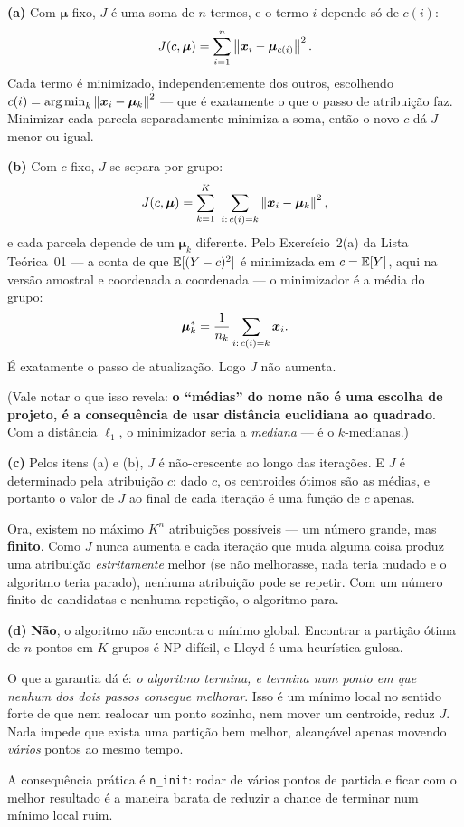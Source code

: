 \documentclass[11pt,a4paper]{article}
\begin{document}
\begin{solucao}
\textbf{(a)} Com $\bm\mu$ fixo, $J$ é uma soma de $n$ termos, e o termo $i$
depende só de $c(i)$:
\[
  J(c,\bm\mu) = \sum_{i=1}^n \left\lVert \bm{x}_i-\bm\mu_{c(i)} \right\rVert^2 .
\]
Cada termo é minimizado, independentemente dos outros, escolhendo
$c(i)=\argmin_k\norm{\x_i-\bm\mu_k}^2$ --- que é exatamente o que o passo de
atribuição faz. Minimizar cada parcela separadamente minimiza a soma, então o
novo $c$ dá $J$ menor ou igual.

\smallskip
\textbf{(b)} Com $c$ fixo, $J$ se separa por grupo:
\[
  J(c,\bm\mu) = \sum_{k=1}^{K}\ \sum_{i:\,c(i)=k}\left\lVert \bm{x}_i-\bm\mu_k \right\rVert^2 ,
\]
e cada parcela depende de um $\bm\mu_k$ diferente. Pelo Exercício~2(a) da Lista
Teórica~01 --- a conta de que $\mathbb{E}[(Y-c)^2]$ é minimizada em $c=\mathbb{E}[Y]$, aqui na
versão amostral e coordenada a coordenada --- o minimizador é a média do grupo:
\[
  \bm\mu_k^\ast = \frac{1}{n_k}\sum_{i:\,c(i)=k}\bm{x}_i .
\]
É exatamente o passo de atualização. Logo $J$ não aumenta.

(Vale notar o que isso revela: \textbf{o ``médias'' do nome não é uma escolha de
projeto, é a consequência de usar distância euclidiana ao quadrado}. Com a
distância $\ell_1$, o minimizador seria a \emph{mediana} --- é o $k$-medianas.)

\smallskip
\textbf{(c)} Pelos itens (a) e (b), $J$ é não-crescente ao longo das iterações. E
$J$ é determinado pela atribuição $c$: dado $c$, os centroides ótimos são as
médias, e portanto o valor de $J$ ao final de cada iteração é uma função de $c$
apenas.

Ora, existem no máximo $K^n$ atribuições possíveis --- um número grande, mas
\textbf{finito}. Como $J$ nunca aumenta e cada iteração que muda alguma coisa
produz uma atribuição \emph{estritamente} melhor (se não melhorasse, nada teria
mudado e o algoritmo teria parado), nenhuma atribuição pode se repetir. Com um
número finito de candidatas e nenhuma repetição, o algoritmo para.

\smallskip
\textbf{(d)} \textbf{Não}, o algoritmo não encontra o mínimo global. Encontrar a
partição ótima de $n$ pontos em $K$ grupos é NP-difícil, e Lloyd é uma heurística
gulosa.

O que a garantia dá é: \emph{o algoritmo termina, e termina num ponto em que
nenhum dos dois passos consegue melhorar}. Isso é um mínimo local no sentido
forte de que nem realocar um ponto sozinho, nem mover um centroide, reduz $J$.
Nada impede que exista uma partição bem melhor, alcançável apenas movendo
\emph{vários} pontos ao mesmo tempo.

A consequência prática é \texttt{n\_init}: rodar de vários pontos de partida e
ficar com o melhor resultado é a maneira barata de reduzir a chance de terminar
num mínimo local ruim.
\end{solucao}
\end{document}
